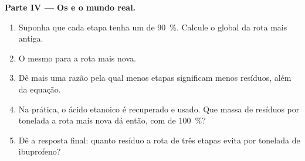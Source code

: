 \begin{problem}
\medskip
\noindent\textbf{Parte IV --- Os  e o mundo real.}
\begin{enumerate}[resume]
  \item Suponha que cada etapa tenha um  de
        \qty{90}{\percent}. Calcule o  global da rota mais
        antiga.
  \item O mesmo para a rota mais nova.
  \item Dê mais uma razão pela qual menos etapas significam menos
        resíduos, além da equação.
  \item Na prática, o ácido etanoico é recuperado e usado. Que massa de
        resíduos por tonelada a rota mais nova dá então, com 
        de \qty{100}{\percent}?
  \item Dê a resposta final: quanto resíduo a rota de três etapas evita
        por tonelada de ibuprofeno?
\end{enumerate}
\end{problem}
